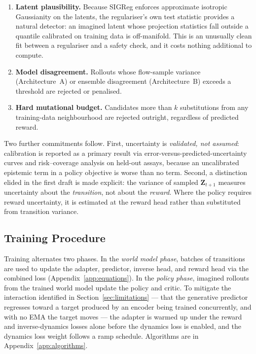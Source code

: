 \documentclass[12pt, a4paper]{article}
\begin{document}
\begin{enumerate}
    \item \textbf{Latent plausibility.} Because SIGReg enforces approximate isotropic Gaussianity on the latents, the regulariser's own test statistic provides a natural detector: an imagined latent whose projection statistics fall outside a quantile calibrated on training data is off-manifold. This is an unusually clean fit between a regulariser and a safety check, and it costs nothing additional to compute.
    \item \textbf{Model disagreement.} Rollouts whose flow-sample variance (Architecture~A) or ensemble disagreement (Architecture~B) exceeds a threshold are rejected or penalised.
    \item \textbf{Hard mutational budget.} Candidates more than $k$ substitutions from any training-data neighbourhood are rejected outright, regardless of predicted reward.
\end{enumerate}

Two further commitments follow. First, uncertainty is \textit{validated, not assumed}: calibration is reported as a primary result via error-versus-predicted-uncertainty curves and risk--coverage analysis on held-out assays, because an uncalibrated epistemic term in a policy objective is worse than no term. Second, a distinction elided in the first draft is made explicit: the variance of sampled $\mathbf{Z}_{t+1}$ measures uncertainty about the \textit{transition}, not about the \textit{reward}. Where the policy requires reward uncertainty, it is estimated at the reward head rather than substituted from transition variance.

\subsection{Training Procedure}

Training alternates two phases. In the \textit{world model phase}, batches of transitions are used to update the adapter, predictor, inverse head, and reward head via the combined loss (Appendix~\ref{app:equations}). In the \textit{policy phase}, imagined rollouts from the trained world model update the policy and critic. To mitigate the interaction identified in Section~\ref{sec:limitations} --- that the generative predictor regresses toward a target produced by an encoder being trained concurrently, and with no EMA the target moves --- the adapter is warmed up under the reward and inverse-dynamics losses alone before the dynamics loss is enabled, and the dynamics loss weight follows a ramp schedule. Algorithms are in Appendix~\ref{app:algorithms}.
\end{document}
